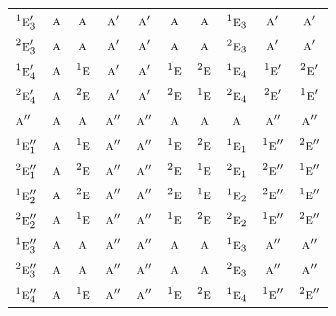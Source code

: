 \documentclass[10pt,a4paper]{article}
\numberwithin{equation}{section}
\newcommand{\irr}[1]{\text{\normalfont\scshape #1}}
\newcommand{\conjpair}[1]{{}^{#1}}
\begin{document}
{\begin{longtable}{@{}lccccccccc@{}}
$\conjpair{1}\irr{e}_{3}'$ & $\irr{a}$ & $\irr{a}$ & $\irr{a}'$ & $\irr{a}'$ & $\irr{a}$ & $\irr{a}$ & $\conjpair{1}\irr{e}_{3}$ & $\irr{a}'$ & $\irr{a}'$\\
$\conjpair{2}\irr{e}_{3}'$ & $\irr{a}$ & $\irr{a}$ & $\irr{a}'$ & $\irr{a}'$ & $\irr{a}$ & $\irr{a}$ & $\conjpair{2}\irr{e}_{3}$ & $\irr{a}'$ & $\irr{a}'$\\
$\conjpair{1}\irr{e}_{4}'$ & $\irr{a}$ & $\conjpair{1}\irr{e}$ & $\irr{a}'$ & $\irr{a}'$ & $\conjpair{1}\irr{e}$ & $\conjpair{2}\irr{e}$ & $\conjpair{1}\irr{e}_{4}$ & $\conjpair{1}\irr{e}'$ & $\conjpair{2}\irr{e}'$\\
$\conjpair{2}\irr{e}_{4}'$ & $\irr{a}$ & $\conjpair{2}\irr{e}$ & $\irr{a}'$ & $\irr{a}'$ & $\conjpair{2}\irr{e}$ & $\conjpair{1}\irr{e}$ & $\conjpair{2}\irr{e}_{4}$ & $\conjpair{2}\irr{e}'$ & $\conjpair{1}\irr{e}'$\\
$\irr{a}''$ & $\irr{a}$ & $\irr{a}$ & $\irr{a}''$ & $\irr{a}''$ & $\irr{a}$ & $\irr{a}$ & $\irr{a}$ & $\irr{a}''$ & $\irr{a}''$\\
$\conjpair{1}\irr{e}_{1}''$ & $\irr{a}$ & $\conjpair{1}\irr{e}$ & $\irr{a}''$ & $\irr{a}''$ & $\conjpair{1}\irr{e}$ & $\conjpair{2}\irr{e}$ & $\conjpair{1}\irr{e}_{1}$ & $\conjpair{1}\irr{e}''$ & $\conjpair{2}\irr{e}''$\\
$\conjpair{2}\irr{e}_{1}''$ & $\irr{a}$ & $\conjpair{2}\irr{e}$ & $\irr{a}''$ & $\irr{a}''$ & $\conjpair{2}\irr{e}$ & $\conjpair{1}\irr{e}$ & $\conjpair{2}\irr{e}_{1}$ & $\conjpair{2}\irr{e}''$ & $\conjpair{1}\irr{e}''$\\
$\conjpair{1}\irr{e}_{2}''$ & $\irr{a}$ & $\conjpair{2}\irr{e}$ & $\irr{a}''$ & $\irr{a}''$ & $\conjpair{2}\irr{e}$ & $\conjpair{1}\irr{e}$ & $\conjpair{1}\irr{e}_{2}$ & $\conjpair{2}\irr{e}''$ & $\conjpair{1}\irr{e}''$\\
$\conjpair{2}\irr{e}_{2}''$ & $\irr{a}$ & $\conjpair{1}\irr{e}$ & $\irr{a}''$ & $\irr{a}''$ & $\conjpair{1}\irr{e}$ & $\conjpair{2}\irr{e}$ & $\conjpair{2}\irr{e}_{2}$ & $\conjpair{1}\irr{e}''$ & $\conjpair{2}\irr{e}''$\\
$\conjpair{1}\irr{e}_{3}''$ & $\irr{a}$ & $\irr{a}$ & $\irr{a}''$ & $\irr{a}''$ & $\irr{a}$ & $\irr{a}$ & $\conjpair{1}\irr{e}_{3}$ & $\irr{a}''$ & $\irr{a}''$\\
$\conjpair{2}\irr{e}_{3}''$ & $\irr{a}$ & $\irr{a}$ & $\irr{a}''$ & $\irr{a}''$ & $\irr{a}$ & $\irr{a}$ & $\conjpair{2}\irr{e}_{3}$ & $\irr{a}''$ & $\irr{a}''$\\
$\conjpair{1}\irr{e}_{4}''$ & $\irr{a}$ & $\conjpair{1}\irr{e}$ & $\irr{a}''$ & $\irr{a}''$ & $\conjpair{1}\irr{e}$ & $\conjpair{2}\irr{e}$ & $\conjpair{1}\irr{e}_{4}$ & $\conjpair{1}\irr{e}''$ & $\conjpair{2}\irr{e}''$\\

\end{longtable}}
\end{document}
